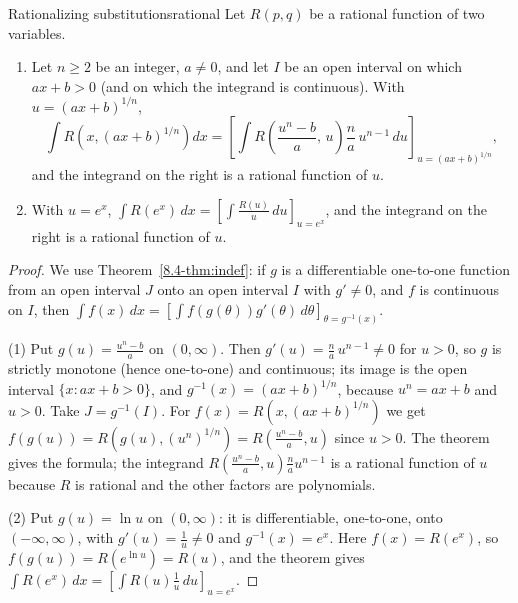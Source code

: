 \documentclass[11pt]{article}
\begin{document}
\begin{thm}{Rationalizing substitutions}{rational}
Let $R(p,q)$ be a rational function of two variables.
\begin{enumerate}[label=(\arabic*)]
  \item Let $n\ge2$ be an integer, $a\ne0$, and let $I$ be an open interval on which $ax+b>0$ (and on which the integrand is continuous). With $u=(ax+b)^{1/n}$,
  \[\int R\left(x,(ax+b)^{1/n}\right)dx=\left[\int R\left(\frac{u^n-b}a,\,u\right)\frac na\,u^{n-1}\,du\right]_{u=(ax+b)^{1/n}},\]
  and the integrand on the right is a rational function of $u$.
  \item With $u=e^x$, $\displaystyle\int R(e^x)\,dx=\left[\int\frac{R(u)}u\,du\right]_{u=e^x}$, and the integrand on the right is a rational function of $u$.
\end{enumerate}
\end{thm}
\begin{proof}
We use Theorem~\ref{8.4-thm:indef}: if $g$ is a differentiable one-to-one function from an open interval $J$ onto an open interval $I$ with $g'\ne0$, and $f$ is continuous on $I$, then $\int f(x)\,dx=\left[\int f(g(\theta))g'(\theta)\,d\theta\right]_{\theta=g^{-1}(x)}$.

(1) Put $g(u)=\frac{u^n-b}a$ on $(0,\infty)$. Then $g'(u)=\frac na\,u^{n-1}\ne0$ for $u>0$, so $g$ is strictly monotone (hence one-to-one) and continuous; its image is the open interval $\{x:ax+b>0\}$, and $g^{-1}(x)=(ax+b)^{1/n}$, because $u^n=ax+b$ and $u>0$. Take $J=g^{-1}(I)$. For $f(x)=R\left(x,(ax+b)^{1/n}\right)$ we get $f(g(u))=R\left(g(u),(u^n)^{1/n}\right)=R\left(\frac{u^n-b}a,u\right)$ since $u>0$. The theorem gives the formula; the integrand $R\left(\frac{u^n-b}a,u\right)\frac na u^{n-1}$ is a rational function of $u$ because $R$ is rational and the other factors are polynomials.

(2) Put $g(u)=\ln u$ on $(0,\infty)$: it is differentiable, one-to-one, onto $(-\infty,\infty)$, with $g'(u)=\frac1u\ne0$ and $g^{-1}(x)=e^x$. Here $f(x)=R(e^x)$, so $f(g(u))=R(e^{\ln u})=R(u)$, and the theorem gives $\int R(e^x)\,dx=\left[\int R(u)\frac1u\,du\right]_{u=e^x}$.
\end{proof}
\end{document}
